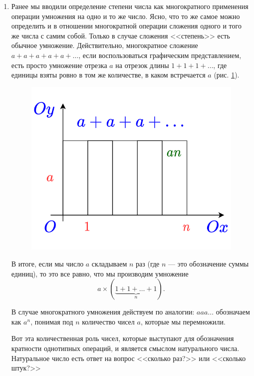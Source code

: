 \begin{enumerate}
\item Ранее мы вводили определение степени числа как многократного применения операции умножения на одно и то же число. Ясно, что то же самое можно определить и в отношении многократной операции сложения одного и того же числа с самим собой. Только в случае сложения <<степень>> есть обычное умножение. Действительно, многократное сложение $a+a+a+a+a+\dots$, если воспользоваться графическим представлением, есть просто умножение отрезка $a$ на отрезок длины $1+1+1+\dots$, где единицы взяты ровно в том же количестве, в каком встречается $a$ (рис. \ref{kratplus}).

\begin{figure}[hbt!]
\begin{center}
\includegraphics[scale=0.2]{kratplus.png}
\end{center}
\caption{}\label{kratplus}
\end{figure}

В итоге, если мы число $a$ складываем $n$ раз (где $n$ --- это обозначение суммы единиц), то это все равно, что мы производим умножение
$$
a\times(\underbrace{1+1+\dots+1}_{n}).
$$

В случае многократного умножения действуем по аналогии:  $a a a\ldots$ обозначаем как $a^n$, понимая под $n$ количество чисел $a$, которые мы перемножили.

Вот эта количественная роль чисел, которые выступают для обозначения кратности однотипных операций, и является смыслом натурального числа. Натуральное число есть ответ на вопрос <<сколько раз?>> или <<сколько штук?>>


\end{enumerate}
